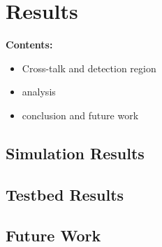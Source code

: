 \chapter{Results} %
\noindent\textbf{\large Contents:}

\noindent\hrulefill
\noindent\startcontents[chapters]
\noindent{}
\noindent\hrulefill
\label{Chapter4}

\begin{itemize}
    \item Cross-talk and detection region
    \item analysis
    \item conclusion and future work
\end{itemize}

\section{Simulation Results}




\section{Testbed Results}



\section{Future Work}